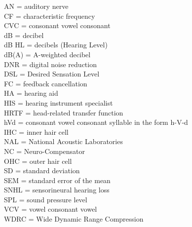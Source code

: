 
AN = auditory nerve \\
CF = characteristic frequency \\
CVC = consonant vowel consonant \\
dB = decibel \\
dB HL = decibels (Hearing Level) \\
dB(A) = A-weighted decibel \\
DNR = digital noise reduction \\
DSL = Desired Sensation Level \\
FC = feedback cancellation \\
HA = hearing aid \\
HIS = hearing instrument specialist \\
HRTF = head-related transfer function \\
hVd = consonant vowel consonant syllable in the form h-V-d \\
IHC = inner hair cell \\
NAL = National Acoustic Laboratories \\
NC = Neuro-Compensator \\
OHC = outer hair cell \\
SD = standard deviation \\
SEM = standard error of the mean \\
SNHL = sensorineural hearing loss \\
SPL = sound pressure level \\
VCV = vowel consonant vowel \\
WDRC = Wide Dynamic Range Compression \\
